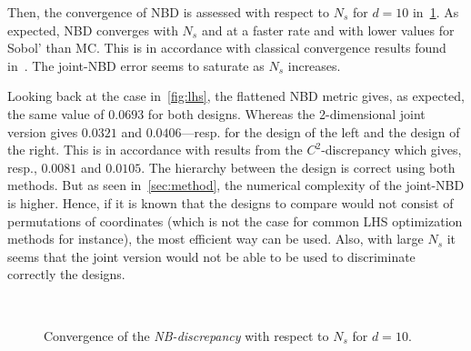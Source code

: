 \documentclass[1p,authoryear]{elsarticle}
\begin{document}
\cleardoublepage

Then, the convergence of NBD is assessed with respect to $N_s$ for $d=10$ in~\cref{fig:metric}. As expected, NBD converges with $N_s$ and at a faster rate and with lower values for Sobol' than MC. This is in accordance with classical convergence results found in~\citep{Kucherenko2015}. The joint-NBD error seems to saturate as $N_s$ increases.

Looking back at the case in~\cref{fig:lhs}, the flattened NBD metric gives, as expected, the same value of $0.0693$ for both designs. Whereas the 2-dimensional joint version gives $0.0321$ and $0.0406$---resp. for the design of the left and the design of the right. This is in accordance with results from the $C^2$-discrepancy which gives, resp., $0.0081$ and $0.0105$. The hierarchy between the design is correct using both methods. But as seen in~\cref{sec:method}, the numerical complexity of the joint-NBD is higher. Hence, if it is known that the designs to compare would not consist of permutations of coordinates (which is not the case for common LHS optimization methods for instance), the most efficient way can be used. Also, with large $N_s$ it seems that the joint version would not be able to be used to discriminate correctly the designs.

\begin{figure}[!h]               
\centering
{}
~

\caption{Convergence of the \emph{NB-discrepancy} with respect to $N_s$ for $d=10$.}
\label{fig:metric}
\end{figure}
\end{document}
